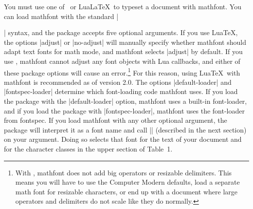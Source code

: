 \documentclass[12pt,twoside]{article}
\begin{document}
You must use one of \XeLaTeX\ or Lua\LaTeX\ to typeset a document with \textsf{mathfont}. You can load \textsf{mathfont} with the standard |\usepackage{mathfont}| syntax, and the package accepts five optional arguments. If you use Lua\TeX, the options |adjust| or |no-adjust| will manually specify whether \textsf{mathfont} should adapt text fonts for math mode, and \textsf{mathfont} selects |adjust| by default. If you use \XeTeX, \textsf{mathfont} cannot adjust any font objects with Lua callbacks, and either of these package options will cause an error.\footnote{With \XeLaTeX, \textsf{mathfont} does not add big operators or resizable delimiters. This means you will have to use the Computer Modern defaults, load a separate math font for resizable characters, or end up with a document where large operators and delimiters do not scale like they do normally.} For this reason, using Lua\TeX\ with \textsf{mathfont} is recommended as of version 2.0. The options |default-loader| and |fontspec-loader| determine which font-loading code \textsf{mathfont} uses. If you load the package with the |default-loader| option, \textsf{mathfont} uses a built-in font-loader, and if you load the package with |fontspec-loader|, \textsf{mathfont} uses the font-loader from \textsf{fontspec}. If you load \textsf{mathfont} with any other optional argument, the package will interpret it as a font name and call |\setfont| (described in the next section) on your argument. Doing so selects that font for the text of your document and for the character classes in the upper section of Table~1.
\end{document}
